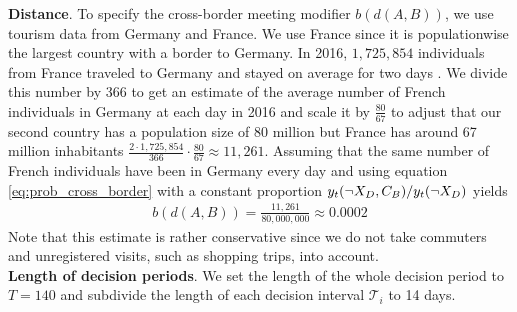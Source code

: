 \textbf{Distance}. To specify the cross-border meeting modifier $b(d(A,B))$, we use tourism data from Germany and France. We use France since it is populationwise the largest country with a border to Germany. In 2016, $1,725,854$ individuals from France traveled to Germany and stayed on average for two days \citep{SBA.2017}. We divide this number by 366 to get an estimate of the average number of French individuals in Germany at each day in 2016 and scale it by $\frac{80}{67}$ to adjust that our second country has a population size of 80 million but France has around 67 million inhabitants $\frac{2 \cdot 1,725,854}{366} \cdot \frac{80}{67
} \approx 11,261$. Assuming that the same number of French individuals have been in Germany every day and using equation \eqref{eq:prob_cross_border} with a constant proportion $y_t(\neg X_D, C_B) / y_t(\neg X_D)$ yields 
\begin{align*}
b(d(A, B)) = \frac{11,261}{80,000,000} \approx 0.0002
\end{align*}
Note that this estimate is rather conservative since we do not take commuters and unregistered visits, such as shopping trips, into account. \\

\textbf{Length of decision periods}. We set the length of the whole decision period to $T=140$ and subdivide the length of each decision interval $\mathcal{T}_i$ to 14 days. \\

